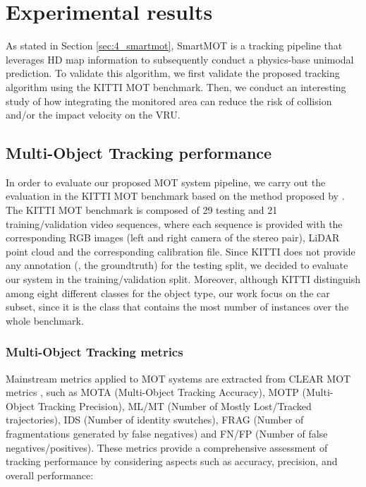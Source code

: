 \section{Experimental results}
\label{sec:5_mot_and_euroncap}

As stated in Section \ref{sec:4_smartmot}, SmartMOT is a tracking pipeline that leverages HD map information to subsequently conduct a physics-base unimodal prediction. To validate this algorithm, we first validate the proposed tracking algorithm using the KITTI \ac{MOT} benchmark. Then, we conduct an interesting study of how integrating the monitored area can reduce the risk of collision and/or the impact velocity on the \ac{VRU}.

\subsection{Multi-Object Tracking performance}
\label{subsec:4_mot_results}

In order to evaluate our proposed \ac{MOT} system pipeline, we carry out the evaluation in the KITTI \ac{MOT} benchmark based on the method proposed by \cite{weng20203d}. The KITTI MOT benchmark is composed of 29 testing and 21 training/validation video sequences, where each sequence is provided with the corresponding RGB images (left and right camera of the stereo pair), LiDAR point cloud and the corresponding calibration file. Since KITTI does not provide any annotation (\ie, the groundtruth) for the testing split, we decided to evaluate our system in the training/validation split. Moreover, although KITTI distinguish among eight different classes for the object type, our work focus on the car subset, since it is the class that contains the most number of instances over the whole benchmark.

\subsubsection{Multi-Object Tracking metrics}
\label{subsubsec:4_mot_metrics}

Mainstream metrics applied to MOT systems are extracted from CLEAR MOT metrics \cite{bernardin2008evaluating}, such as MOTA (Multi-Object Tracking Accuracy), MOTP (Multi-Object Tracking Precision), ML/MT (Number of Mostly Lost/Tracked trajectories), IDS (Number of identity swutches), FRAG (Number of fragmentations generated by false negatives) and FN/FP (Number of false negatives/positives). These metrics provide a comprehensive assessment of tracking performance by considering aspects such as accuracy, precision, and overall performance:

